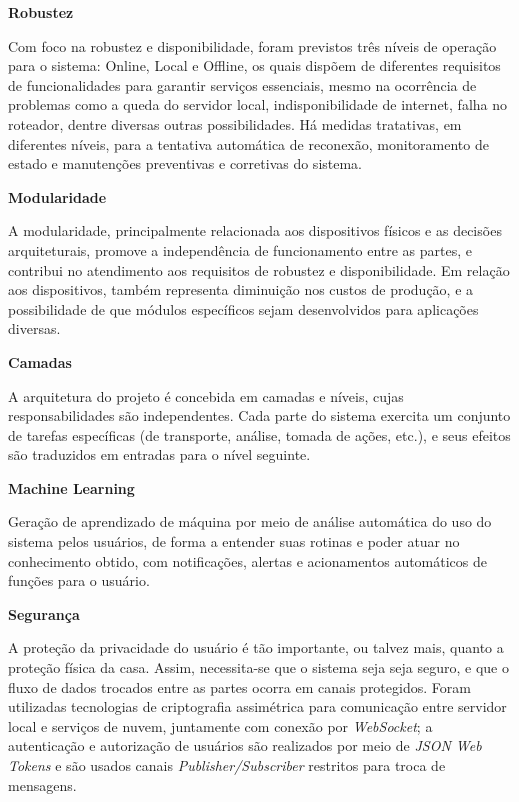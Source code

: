 \begin{description}
\item \textbf{Robustez}

Com foco na robustez e disponibilidade, foram previstos três níveis de operação para o sistema: Online, Local e Offline, os quais dispõem de diferentes requisitos de funcionalidades para garantir serviços essenciais, mesmo na ocorrência de problemas como a queda do servidor local, indisponibilidade de internet, falha no roteador, dentre diversas outras possibilidades. Há medidas tratativas, em diferentes níveis, para a tentativa automática de reconexão, monitoramento de estado e manutenções preventivas e corretivas do sistema.

\item \textbf{Modularidade}

A modularidade, principalmente relacionada aos dispositivos físicos e as decisões arquiteturais, promove a independência de funcionamento entre as partes, e contribui no atendimento aos requisitos de robustez e disponibilidade. Em relação aos dispositivos, também representa diminuição nos custos de produção, e a possibilidade de que módulos específicos sejam desenvolvidos para aplicações diversas.

\item \textbf{Camadas}

A arquitetura do projeto é concebida em camadas e níveis, cujas responsabilidades são independentes. Cada parte do sistema exercita um conjunto de tarefas específicas (de transporte, análise, tomada de ações, etc.), e seus efeitos são traduzidos em entradas para o nível seguinte.

\item \textbf{Machine Learning}

Geração de aprendizado de máquina por meio de análise automática do uso do sistema pelos usuários, de forma a entender suas rotinas e poder atuar no conhecimento obtido, com notificações, alertas e acionamentos automáticos de funções para o usuário.

\item \textbf{Segurança}

A proteção da privacidade do usuário é tão importante, ou talvez mais, quanto a proteção física da casa. Assim, necessita-se que o sistema seja seja seguro, e que o fluxo de dados trocados entre as partes ocorra em canais protegidos. Foram utilizadas tecnologias de criptografia assimétrica para comunicação entre servidor local e serviços de nuvem, juntamente com conexão por \textit{WebSocket}; a autenticação e autorização de usuários são realizados por meio de \textit{JSON Web Tokens} e são usados canais \textit{Publisher/Subscriber} restritos para troca de mensagens.

\end{description}

